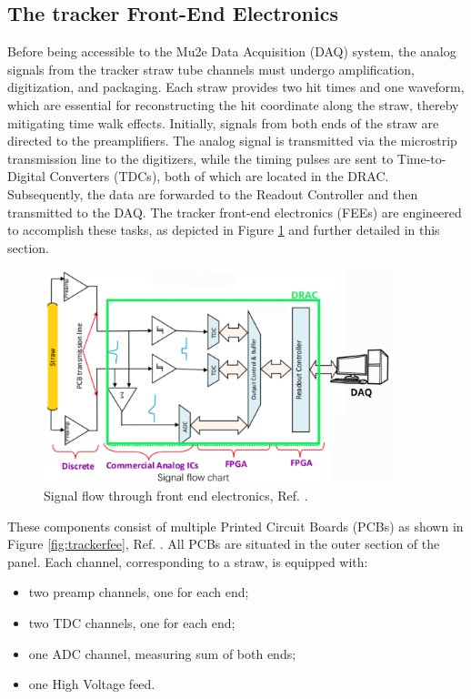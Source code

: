 \subsection{The tracker Front-End Electronics}\label{tfee}
Before being accessible to the Mu2e Data Acquisition (DAQ) system, the analog signals 
from the tracker straw tube channels must undergo amplification, digitization, and packaging. 
Each straw provides two hit times and one waveform, which are essential for 
reconstructing the hit coordinate along the straw, thereby mitigating time walk effects.
Initially, signals from both ends of the straw are directed to the preamplifiers. 
The analog signal is transmitted via the microstrip transmission line to the digitizers, 
while the timing pulses are sent to Time-to-Digital Converters (TDCs), both of which 
are located in the DRAC. Subsequently, the data are forwarded to the Readout Controller and then transmitted to the DAQ.
The tracker front-end electronics (FEEs) are engineered to accomplish these tasks, as depicted in Figure \ref{fig:flowfee} and further detailed in this section.
\\
\begin{figure}[!h]
    \centering
    \includegraphics[width =0.9\textwidth]{figures/png/Screenshot_20240529_133230.png}
    \caption{Signal flow through front end electronics, Ref. \cite{bartoszek2015mu2e}.}
    \label{fig:flowfee}
    \end{figure}
These components consist of multiple Printed Circuit Boards (PCBs) as shown in Figure \ref{fig:trackerfee}, Ref. \cite{vadimmu2e}.
All PCBs are situated in the outer section of the panel. Each channel, corresponding to a straw, is equipped with:
\begin{itemize}
    \item two preamp channels, one for each end;
    \item two TDC channels, one for each end;
    \item one ADC channel, measuring sum of both ends;
    \item one High Voltage feed.
\end{itemize}
